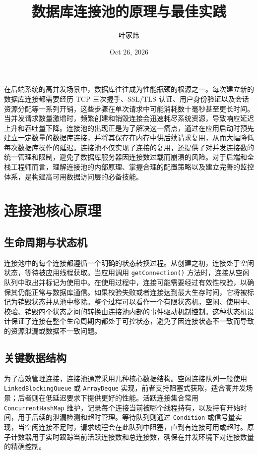 \title{数据库连接池的原理与最佳实践}
\author{叶家炜}
\date{Oct 26, 2026}
\maketitle
在后端系统的高并发场景中，数据库往往成为性能瓶颈的根源之一。每次建立新的数据库连接都需要经历 TCP 三次握手、SSL/TLS 认证、用户身份验证以及会话资源分配等一系列开销，这些步骤在单次请求中可能消耗数十毫秒甚至更长时间。当并发请求数量激增时，频繁创建和销毁连接会迅速耗尽系统资源，导致响应延迟上升和吞吐量下降。连接池的出现正是为了解决这一痛点，通过在应用启动时预先建立一定数量的数据库连接，并将其保存在内存中供后续请求复用，从而大幅降低每次数据库操作的延迟。连接池不仅实现了连接的复用，还提供了对并发连接数的统一管理和限制，避免了数据库服务器因连接数过载而崩溃的风险。对于后端和全栈工程师而言，理解连接池的内部原理、掌握合理的配置策略以及建立完善的监控体系，是构建高可用数据访问层的必备技能。\par
\chapter{连接池核心原理}
\section{生命周期与状态机}
连接池中的每个连接都遵循一个明确的状态转换过程。从创建之初，连接处于空闲状态，等待被应用线程获取。当应用调用 \texttt{getConnection()} 方法时，连接从空闲队列中取出并标记为使用中。在使用过程中，连接可能需要经过有效性校验，以确保其仍能正常与数据库通信。如果校验失败或者连接达到最大生存时间，它将被标记为销毁状态并从池中移除。整个过程可以看作一个有限状态机，空闲、使用中、校验、销毁四个状态之间的转换由连接池内部的事件驱动机制控制。这种状态机设计保证了连接在整个生命周期内都处于可控状态，避免了因连接状态不一致而导致的资源泄漏或数据不一致问题。\par
\section{关键数据结构}
为了高效管理连接，连接池通常采用几种核心数据结构。空闲连接队列一般使用 \texttt{LinkedBlockingQueue} 或 \texttt{ArrayDeque} 实现，前者支持阻塞式获取，适合高并发场景；后者则在低延迟要求下提供更好的性能。活跃连接集合常用 \texttt{ConcurrentHashMap} 维护，记录每个连接当前被哪个线程持有，以及持有开始时间，用于后续的泄漏检测和超时管理。等待队列则通过 \texttt{Condition} 或信号量实现，当空闲连接不足时，请求线程会在此队列中阻塞，直到有连接可用或超时。原子计数器用于实时跟踪当前活跃连接数和总连接数，确保在并发环境下对连接数量的精确控制。\par

